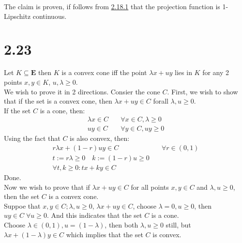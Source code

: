 \documentclass[]{article}
\begin{document}
    The claim is proven, if follows from \hyperref[eqn:2.18.1]{2.18.1} that the projection function is 1-Lipschitz continuous.
    
\section*{2.23}
    Let $K\subseteq \mathbf{E}$ then $K$ is a convex cone iff the point $\lambda x + u y$ lies in $K$ for any 2 points $x, y \in K$, $u, \lambda \ge 0$. 
    \\[1.1em]
    We wish to prove it in 2 directions. Consier the cone $C$.  First, we wish to show that if the set is a convex cone, then $\lambda x + u y \in C$ forall $\lambda, u \ge 0$. 
    \\
    If the set $C$ is a cone, then: 
    \begin{align*}\tag{2.23.1}\label{eqn:2.23.1}
        \lambda x \in C & \quad \forall x \in C, \lambda \ge 0
        \\
        u y \in C &\quad \forall  y \in C, uy \ge 0
    \end{align*}
    Using the fact that $C$ is also convex, then: 
    \begin{align*}\tag{2.23.2}\label{eqn:2.23.2}
        r\lambda x + (1 - r) u y\in C & \quad \forall r \in (0, 1)
        \\
        t:= r \lambda \ge 0 \quad  k := (1 - r)u \ge 0  &
        \\
        \forall t, k \ge 0: tx + ky \in C
    \end{align*}
    Done. 
    \\[1.1em]
    Now we wish to prove that if $\lambda x + u y \in C$ for all points $x, y \in C$ and $\lambda, u \ge 0$, then the set $C$ is a convex cone. 
    \\
    Suppoe that $x, y \in C; \lambda, u \ge 0$, $\lambda x + u y \in C$, choose $\lambda = 0, u \ge 0$, then $u y \in C\; \forall u \ge 0$. And this indicates that the set $C$ is a cone. 
    \\
    Choose $\lambda \in (0, 1), u = (1 - \lambda)$, then both $\lambda, u \ge 0$ still, but $\lambda x + (1 - \lambda) y \in C$ which implies that the set $C$ is convex. 
\end{document}
